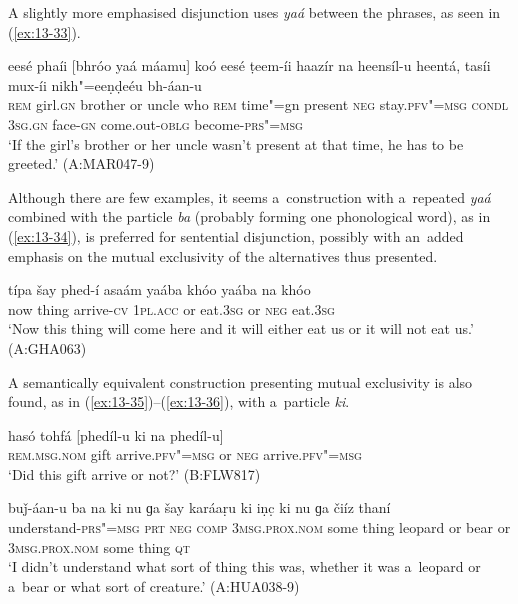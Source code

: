  A slightly more emphasised disjunction uses \textit{yaá} between the phrases, as seen in (\ref{ex:13-33}).

\begin{exe}
\ex
\label{ex:13-33}
\gll eesé phaíi [bhróo yaá máamu] koó eesé ṭeem-íi haazír na heensíl-u heentá, tasíi mux-íi nikh"=eeṇḍeéu bh-áan-u \\
\textsc{rem} girl.\textsc{gn} brother or uncle who \textsc{rem} time"=gn  present \textsc{neg} stay.\textsc{pfv"=msg} \textsc{condl} \textsc{3sg.gn} face-\textsc{gn}  come.out-\textsc{oblg} become-\textsc{prs"=msg}  \\
\glt `If the girl's brother or her uncle wasn't present at that time, he has to be greeted.' (A:MAR047-9) 
\end{exe}

 Although there are few examples, it seems a~construction with a~repeated \textit{yaá} combined with the particle \textit{ba} (probably forming one phonological word), as in (\ref{ex:13-34}), is preferred for sentential disjunction, possibly with an~added emphasis on the mutual exclusivity of the alternatives thus presented. 

\begin{exe}
\ex
\label{ex:13-34}
\gll típa šay phed-í asaám yaába khóo yaába na khóo \\
now thing arrive-\textsc{cv} \textsc{1pl.acc} or eat.\textsc{3sg} or \textsc{neg} eat.\textsc{3sg} \\
\glt `Now this thing will come here and it will either eat us or it will not eat us.' (A:GHA063) 
\end{exe}

 A semantically equivalent construction presenting mutual exclusivity is also found, as in (\ref{ex:13-35})--(\ref{ex:13-36}), with a~particle \textit{ki}. 

\begin{exe}
\ex
\label{ex:13-35}
\gll hasó tohfá [phedíl-u ki na phedíl-u] \\
\textsc{rem.msg.nom} gift arrive.\textsc{pfv"=msg} or \textsc{neg}  arrive.\textsc{pfv"=msg} \\
\glt `Did this gift arrive or not?' (B:FLW817)

\ex
\label{ex:13-36}
\gll buǰ-áan-u ba na ki nu ɡa šay karáaṛu ki iṇc̣ ki nu ɡa čiíz thaní \\
understand-\textsc{prs"=msg} \textsc{prt} \textsc{neg} \textsc{comp} \textsc{3msg.prox.nom}  some thing leopard or bear or \textsc{3msg.prox.nom} some thing \textsc{qt} \\
\glt `I didn't understand what sort of thing this was, whether it was a~leopard or a~bear or what sort of creature.' (A:HUA038-9) 
\end{exe}

